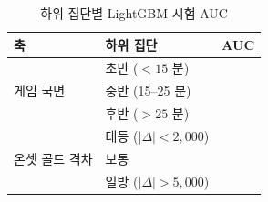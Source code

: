\begin{table}[htbp]
  \centering
  \caption{하위 집단별 LightGBM 시험 AUC}
  \label{tab:conditional}
  \small
  \begin{tabular}{@{}llc@{}}
    \toprule
    축 & 하위 집단 & AUC \\
    \midrule
    \multirow{3}{*}{게임 국면} & 초반 ($<15$ 분) & \aucEarly{} \\
     & 중반 (15--25 분) & \aucMid{} \\
     & 후반 ($>25$ 분) & \aucLate{} \\
    \midrule
    \multirow{3}{*}{온셋 골드 격차} & 대등 ($|\Delta| < 2{,}000$) & \aucClose{} \\
     & 보통 & \aucModerate{} \\
     & 일방 ($|\Delta| > 5{,}000$) & \aucOneSided{} \\
    \bottomrule
  \end{tabular}
\end{table}
